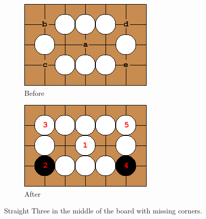 \documentclass{l4proj}
\begin{document}
\begin{figure}[!ht]
\centering
\begin{subfigure}[b]{0.35\textwidth}
\centering
\includegraphics[width=\textwidth]{heur/1a.png}
\caption{Before}
\label{fig:heur-1a}
\end{subfigure}
\begin{subfigure}[b]{0.35\textwidth}
\centering
\includegraphics[width=\textwidth]{heur/1b.png}
\caption{After}
\label{fig:heur-1b}
\end{subfigure}
\caption{Straight Three in the middle of the board with missing corners.}
\label{fig:heur-1}
\end{figure}
\end{document}
